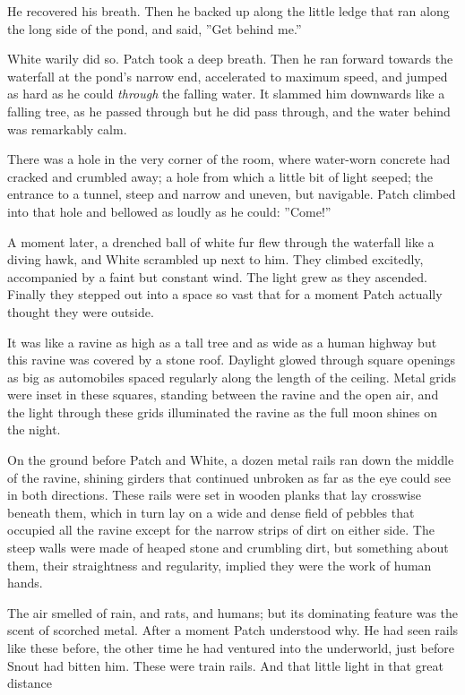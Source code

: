 \documentclass[11pt]{article}
\begin{document}
 He recovered his breath. Then he backed up along the little ledge that ran along the long side of the pond, and said, ''Get behind me.''\par
 White warily did so. Patch took a deep breath. Then he ran forward towards the waterfall at the pond's narrow end, accelerated to maximum speed, and jumped as hard as he could {\it through }the falling water. It slammed him downwards like a falling tree, as he passed through %
 but he did pass through, and the water behind was remarkably calm.\par
There was a hole in the very corner of the room, where water-worn concrete had cracked and crumbled away; a hole from which a little bit of light seeped; the entrance to a tunnel, steep and narrow and uneven, but navigable. Patch climbed into that hole and bellowed as loudly as he could: ''Come!''\par
 A moment later, a drenched ball of white fur flew through the waterfall like a diving hawk, and White scrambled up next to him. They climbed excitedly, accompanied by a faint but constant wind. The light grew as they ascended. Finally they stepped out into a space so vast that for a moment Patch actually thought they were outside.\par
 It was like a ravine as high as a tall tree and as wide as a human highway %
 but this ravine was covered by a stone roof. Daylight glowed through square openings as big as automobiles spaced regularly along the length of the ceiling. Metal grids were inset in these squares, standing between the ravine and the open air, and the light through these grids illuminated the ravine as the full moon shines on the night.\par
 On the ground before Patch and White, a dozen metal rails ran down the middle of the ravine, shining girders that continued unbroken as far as the eye could see in both directions. These rails were set in wooden planks that lay crosswise beneath them, which in turn lay on a wide and dense field of pebbles that occupied all the ravine except for the narrow strips of dirt on either side. The steep walls were made of heaped stone and crumbling dirt, but something about them, their straightness and regularity, implied they were the work of human hands.\par
 The air smelled of rain, and rats, and humans; but its dominating feature was the scent of scorched metal. After a moment Patch understood why. He had seen rails like these before, the other time he had ventured into the underworld, just before Snout had bitten him. These were train rails. And that little light in that great distance %
\end{document}
